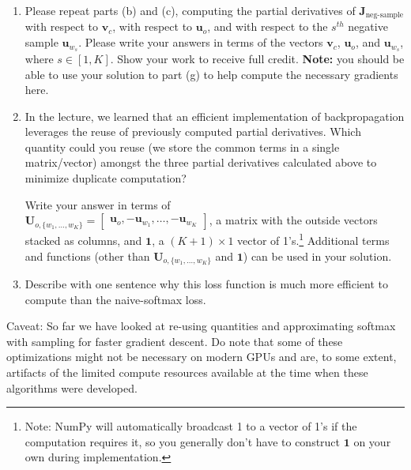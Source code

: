 \documentclass{article}
\begin{document}
\begin{enumerate}[label=(\alph*)]
\begin{enumerate}[label=(\roman*)]
\item Please repeat parts (b) and (c), computing the partial derivatives of $\bm J_{\text{neg-sample}}$ with respect to $\bm v_c$, with respect to $\bm u_o$, and with respect to the $s^{th}$ negative sample $\bm u_{w_s}$. Please write your answers in terms of the vectors $\bm v_c$, $\bm u_o$, and $\bm u_{w_s}$, where $s \in [1, K]$. Show your work to receive full credit. \textbf{Note:} you should be able to use your solution to part (g) to help compute the necessary gradients here.

\item In the lecture, we learned that an efficient implementation of backpropagation leverages the reuse of previously computed partial derivatives. Which quantity could you reuse (we store the common terms in a single matrix/vector) amongst the three partial derivatives calculated above to minimize duplicate computation? 

Write your answer in terms of \\ $\bm{U}_{o, \{w_1, \dots, w_K\}} = \begin{bmatrix} \bm{u}_o, -\bm{u}_{w_1}, \dots, -\bm{u}_{w_K} \end{bmatrix}$, a matrix with the outside vectors stacked as columns, and $\bm{1}$, a $(K + 1) \times 1$ vector of 1's.\footnote{Note: NumPy will automatically broadcast 1 to a vector of 1's if the computation requires it, so you generally don't have to construct $\bm{1}$ on your own during implementation.}
Additional terms and functions (other than $\bm{U}_{o, \{w_1, \dots, w_K\}}$ and $\bm{1}$) can be used in your solution.
\item Describe with one sentence why this loss function is much more efficient to compute than the naive-softmax loss.
\end{enumerate}

Caveat: So far we have looked at re-using quantities and approximating softmax with sampling for faster gradient descent. Do note that some of these optimizations might not be necessary on modern GPUs and are, to some extent, artifacts of the limited compute resources available at the time when these algorithms were developed.


\end{enumerate}
\end{document}
